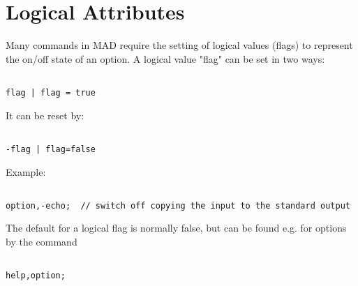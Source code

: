 
\section{Logical Attributes}

Many commands in MAD require the setting of logical values (flags) to
represent the on/off state of an option. A logical value "flag" can be
set in two ways:  
\begin{verbatim}

flag | flag = true
\end{verbatim} 

It can be reset by: 
\begin{verbatim}

-flag | flag=false
\end{verbatim} 

Example: 
\begin{verbatim}

option,-echo;  // switch off copying the input to the standard output
\end{verbatim} 

The default for a logical flag is normally false, but can be found e.g. for options by the command  
\begin{verbatim}

help,option;
\end{verbatim}


